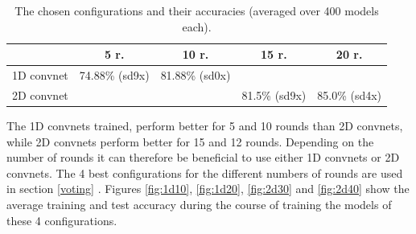 \begin{table}[H]
	\centering
	
		\begin{tabular}{|l||c|c|c|c|}
			\hline
			& 5 r. & 10 r. & 15 r. & 20 r.  \\
			\hline
			\hline
			1D convnet & 74.88\% (sd9x) & 81.88\% (sd0x) & &  \\
			\hline
			2D convnet &  & & 81.5\% (sd9x) & 85.0\% (sd4x)  \\
			\hline
		\end{tabular}
	\caption[The chosen configurations and their accuracies.]{The chosen configurations and their accuracies (averaged over 400 models each). }%
	\label{tab:chosen_configs}
\end{table}

The 1D convnets trained, perform better for 5 and 10 rounds than 2D convnets, while 2D convnets perform better for 15 and 12 rounds. Depending on the number of rounds it can therefore be beneficial to use either 1D convnets or 2D convnets. The 4 best configurations for the different numbers of rounds are used in section \ref{voting} . Figures \ref{fig:1d10}, \ref{fig:1d20}, \ref{fig:2d30} and \ref{fig:2d40} show the average training and test accuracy during the course of training the models of these 4 configurations. 

